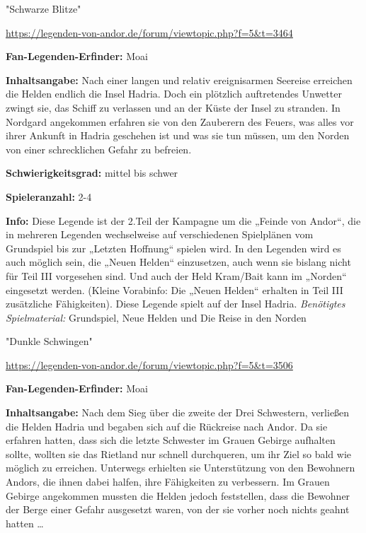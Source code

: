 {\begin{center}
    "Schwarze Blitze"

    \url{https://legenden-von-andor.de/forum/viewtopic.php?f=5&t=3464}
\end{center}

\textbf{Fan-Legenden-Erfinder:} Moai

\textbf{Inhaltsangabe:}
Nach einer langen und relativ ereignisarmen Seereise erreichen die Helden endlich die Insel Hadria. Doch ein plötzlich auftretendes Unwetter zwingt sie, das Schiff zu verlassen und an der Küste der Insel zu stranden. In Nordgard angekommen erfahren sie von den Zauberern des Feuers, was alles vor ihrer Ankunft in Hadria geschehen ist und was sie tun müssen, um den Norden von einer schrecklichen Gefahr zu befreien.

\textbf{Schwierigkeitsgrad:} mittel bis schwer

\textbf{Spieleranzahl:} 2-4

\textbf{Info:}
Diese Legende ist der 2.Teil der Kampagne um die „Feinde von Andor“, die in mehreren Legenden wechselweise auf verschiedenen Spielplänen vom Grundspiel bis zur „Letzten Hoffnung“ spielen wird. In den Legenden wird es auch möglich sein, die „Neuen Helden“ einzusetzen, auch wenn sie bislang nicht für Teil III vorgesehen sind. Und auch der Held Kram/Bait kann im „Norden“ eingesetzt werden. (Kleine Vorabinfo: Die „Neuen Helden“ erhalten in Teil III zusätzliche Fähigkeiten). Diese Legende spielt auf der Insel Hadria.
\textit{Benötigtes Spielmaterial:} Grundspiel, Neue Helden und Die Reise in den Norden






\begin{center}
    "Dunkle Schwingen"

    \url{https://legenden-von-andor.de/forum/viewtopic.php?f=5&t=3506}
\end{center}


\textbf{Fan-Legenden-Erfinder:} Moai

\textbf{Inhaltsangabe:}
Nach dem Sieg über die zweite der Drei Schwestern, verließen die Helden Hadria und begaben sich auf die Rückreise nach Andor. Da sie erfahren hatten, dass sich die letzte Schwester im Grauen Gebirge aufhalten sollte, wollten sie das Rietland nur schnell durchqueren, um ihr Ziel so bald wie möglich zu erreichen. Unterwegs erhielten sie Unterstützung von den Bewohnern Andors, die ihnen dabei halfen, ihre Fähigkeiten zu verbessern.
Im Grauen Gebirge angekommen mussten die Helden jedoch feststellen, dass die Bewohner der Berge einer Gefahr ausgesetzt waren, von der sie vorher noch nichts geahnt hatten …

}
